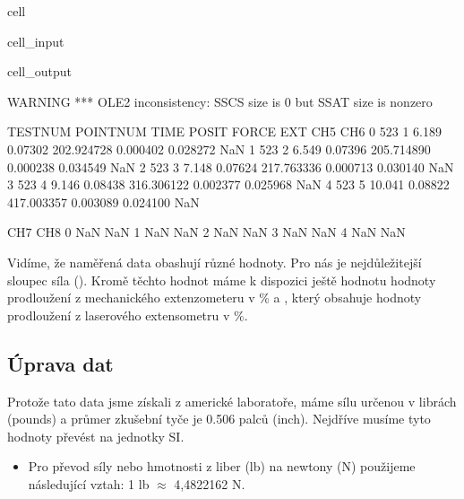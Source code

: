 \documentclass[letterpaper,10pt,english]{jupyterBook}
\begin{document}
{{\begin{sphinxuseclass}{cell}
\begin{sphinxVerbatimInput}
\begin{sphinxuseclass}{cell_input}
\end{sphinxuseclass}\end{sphinxVerbatimInput}
\begin{sphinxVerbatimOutput}

\begin{sphinxuseclass}{cell_output}
\begin{sphinxVerbatim}[commandchars=\\\{\}]
WARNING *** OLE2 inconsistency: SSCS size is 0 but SSAT size is non\PYGZhy{}zero
\end{sphinxVerbatim}

\begin{sphinxVerbatim}[commandchars=\\\{\}]
   TESTNUM  POINTNUM    TIME    POSIT       FORCE       EXT       CH5  CH6  \PYGZbs{}
0      523         1   6.189  0.07302  202.924728  0.000402 \PYGZhy{}0.028272  NaN   
1      523         2   6.549  0.07396  205.714890 \PYGZhy{}0.000238 \PYGZhy{}0.034549  NaN   
2      523         3   7.148  0.07624  217.763336 \PYGZhy{}0.000713 \PYGZhy{}0.030140  NaN   
3      523         4   9.146  0.08438  316.306122  0.002377 \PYGZhy{}0.025968  NaN   
4      523         5  10.041  0.08822  417.003357  0.003089 \PYGZhy{}0.024100  NaN   

   CH7  CH8  
0  NaN  NaN  
1  NaN  NaN  
2  NaN  NaN  
3  NaN  NaN  
4  NaN  NaN  
\end{sphinxVerbatim}

\end{sphinxuseclass}\end{sphinxVerbatimOutput}

\end{sphinxuseclass}
\sphinxAtStartPar
Vidíme, že naměřená data obashují různé hodnoty. Pro nás je nejdůležitejší sloupec síla (). Kromě těchto hodnot máme k dispozici ještě hodnotu  hodnoty prodloužení z mechanického extenzometeru v \% a , který obsahuje hodnoty prodloužení z laserového extensometru v \%.


\subsection{Úprava dat}
\label{\detokenize{Prednasky/2_7_P_u0159_xedklad _tahov_xe9_zkou_u0161ky:uprava-dat}}
\sphinxAtStartPar
Protože tato data jsme získali z americké laboratoře, máme sílu určenou v librách (pounds) a průmer zkušební tyče je 0.506 palců (inch). Nejdříve musíme tyto hodnoty převést na jednotky SI.
\begin{itemize}
\item {} 
\sphinxAtStartPar
Pro převod síly nebo hmotnosti z liber (lb) na newtony (N) použijeme následující vztah: 1 lb \(\approx\)  4,4822162 N.


\end{itemize}}}
\end{document}
